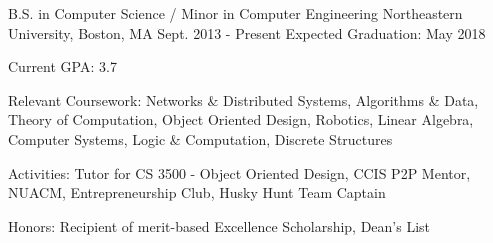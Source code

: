 

\begin{cventries}

  \cventry
    {B.S. in Computer Science / Minor in Computer Engineering} %
    {Northeastern University, Boston, MA} %
    {Sept. 2013 - Present} %
    {Expected Graduation: May 2018} %
    {
      \begin{cvitems} %
        \item {Current GPA: 3.7}
        \item {Relevant Coursework: Networks \& Distributed Systems, Algorithms \& Data, Theory of Computation, Object Oriented Design, Robotics, Linear Algebra, Computer Systems, Logic \& Computation, Discrete Structures}
        \item {Activities: Tutor for CS 3500 - Object Oriented Design, CCIS P2P Mentor, NUACM, Entrepreneurship Club, Husky Hunt Team Captain}
        \item {Honors: Recipient of merit-based Excellence Scholarship, Dean's List}
      \end{cvitems}
    }

\end{cventries}
